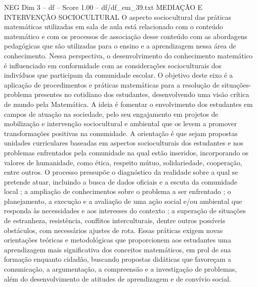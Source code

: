 \begin{textsample}{NEG Dim 3 – df – Score 1.00 – df/df\_em\_39.txt}  \label{ex:f3_neg_168}
MEDIAÇÃO E INTERVENÇÃO SOCIOCULTURAL O aspecto sociocultural das práticas matemáticas utilizadas em sala de aula está relacionado com o conteúdo matemático e com os processos de associação desse conteúdo com as abordagens pedagógicas que são utilizadas para o ensino e a aprendizagem nessa área de conhecimento.
Nessa perspectiva, o desenvolvimento do conhecimento matemático é influenciado em conformidade com as considerações socioculturais dos indivíduos que participam da comunidade escolar.
O objetivo deste eixo é a aplicação de procedimentos e práticas matemáticas para a resolução de situações-problema presentes no cotidiano dos estudantes, desenvolvendo uma visão crítica de mundo pela Matemática.
A ideia é fomentar o envolvimento dos estudantes em campos de atuação na sociedade, pelo seu engajamento em projetos de mobilização e intervenção sociocultural e ambiental que os levem a promover transformações positivas na comunidade.
A orientação é que sejam propostas unidades curriculares baseadas em aspectos socioculturais dos estudantes e nos problemas enfrentados pela comunidade na qual estão inseridos, incorporando os valores de humanidade, como ética, respeito mútuo, solidariedade, cooperação, entre outros.
O processo pressupõe o diagnóstico da realidade sobre a qual se pretende atuar, incluindo a busca de dados oficiais e a escuta da comunidade local ; a ampliação de conhecimentos sobre o problema a ser enfrentado ; o planejamento, a execução e a avaliação de uma ação social e/ou ambiental que responda às necessidades e aos interesses do contexto ; a superação de situações de estranheza, resistência, conflitos interculturais, dentre outros possíveis obstáculos, com necessários ajustes de rota.
Essas práticas exigem novas orientações teóricas e metodológicas que proporcionem aos estudantes uma aprendizagem mais significativa dos conceitos matemáticos, em prol de sua formação enquanto cidadão, buscando propostas didáticas que favoreçam a comunicação, a argumentação, a compreensão e a investigação de problemas, além do desenvolvimento de atitudes de aprendizagem e de convívio social.

\end{textsample}
